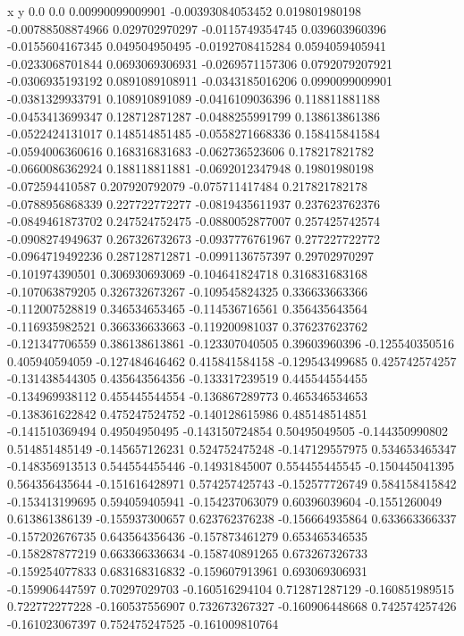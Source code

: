               x                y
            0.0              0.0
0.00990099009901  -0.00393084053452
 0.019801980198  -0.00788508874966
 0.029702970297  -0.0115749354745
 0.039603960396  -0.0155604167345
 0.049504950495  -0.0192708415284
0.0594059405941  -0.0233068701844
0.0693069306931  -0.0269571157306
0.0792079207921  -0.0306935193192
0.0891089108911  -0.0343185016206
0.0990099009901  -0.0381329933791
 0.108910891089  -0.0416109036396
 0.118811881188  -0.0453413699347
 0.128712871287  -0.0488255991799
 0.138613861386  -0.0522424131017
 0.148514851485  -0.0558271668336
 0.158415841584  -0.0594006360616
 0.168316831683  -0.062736523606
 0.178217821782  -0.0660086362924
 0.188118811881  -0.0692012347948
  0.19801980198  -0.072594410587
 0.207920792079  -0.075711417484
 0.217821782178  -0.0788956868339
 0.227722772277  -0.0819435611937
 0.237623762376  -0.0849461873702
 0.247524752475  -0.0880052877007
 0.257425742574  -0.0908274949637
 0.267326732673  -0.0937776761967
 0.277227722772  -0.0964719492236
 0.287128712871  -0.0991136757397
  0.29702970297  -0.101974390501
 0.306930693069  -0.104641824718
 0.316831683168  -0.107063879205
 0.326732673267  -0.109545824325
 0.336633663366  -0.112007528819
 0.346534653465  -0.114536716561
 0.356435643564  -0.116935982521
 0.366336633663  -0.119200981037
 0.376237623762  -0.121347706559
 0.386138613861  -0.123307040505
  0.39603960396  -0.125540350516
 0.405940594059  -0.127484646462
 0.415841584158  -0.129543499685
 0.425742574257  -0.131438544305
 0.435643564356  -0.133317239519
 0.445544554455  -0.134969938112
 0.455445544554  -0.136867289773
 0.465346534653  -0.138361622842
 0.475247524752  -0.140128615986
 0.485148514851  -0.141510369494
  0.49504950495  -0.143150724854
  0.50495049505  -0.144350990802
 0.514851485149  -0.145657126231
 0.524752475248  -0.147129557975
 0.534653465347  -0.148356913513
 0.544554455446   -0.14931845007
 0.554455445545  -0.150445041395
 0.564356435644  -0.151616428971
 0.574257425743  -0.152577726749
 0.584158415842  -0.153413199695
 0.594059405941  -0.154237063079
  0.60396039604    -0.1551260049
 0.613861386139  -0.155937300657
 0.623762376238  -0.156664935864
 0.633663366337  -0.157202676735
 0.643564356436  -0.157873461279
 0.653465346535  -0.158287877219
 0.663366336634  -0.158740891265
 0.673267326733  -0.159254077833
 0.683168316832  -0.159607913961
 0.693069306931  -0.159906447597
  0.70297029703  -0.160516294104
 0.712871287129  -0.160851989515
 0.722772277228  -0.160537556907
 0.732673267327  -0.160906448668
 0.742574257426  -0.161023067397
 0.752475247525  -0.161009810764
